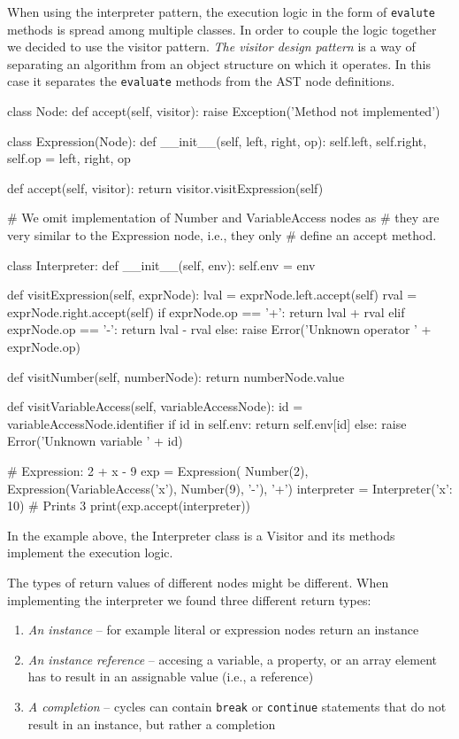 When using the interpreter pattern, the execution logic in the form of \texttt{evalute} methods is spread among multiple classes. In order to couple the
logic together we decided to use the visitor pattern. \emph{The visitor design pattern} is a way of separating an algorithm from an object structure on
which it operates. In this case it separates the \texttt{evaluate} methods from the AST node definitions.
\begin{code}
class Node:
    def accept(self, visitor):
        raise Exception('Method not implemented')

class Expression(Node):
    def __init__(self, left, right, op):
        self.left, self.right, self.op = left, right, op

    def accept(self, visitor):
        return visitor.visitExpression(self)

# We omit implementation of Number and VariableAccess nodes as
# they are very similar to the Expression node, i.e., they only
# define an accept method.

class Interpreter:
    def __init__(self, env):
        self.env = env
    
    def visitExpression(self, exprNode):
        lval = exprNode.left.accept(self)
        rval = exprNode.right.accept(self)
        if exprNode.op == '+':
            return lval + rval
        elif exprNode.op == '-':
            return lval - rval
        else:
            raise Error('Unknown operator ' + exprNode.op)
    
    def visitNumber(self, numberNode):
        return numberNode.value
    
    def visitVariableAccess(self, variableAccessNode):
        id = variableAccessNode.identifier
        if id in self.env:
            return self.env[id]
        else:
            raise Error('Unknown variable ' + id)

# Expression: 2 + x - 9
exp = Expression(
    Number(2),
    Expression(VariableAccess('x'), Number(9), '-'),
    '+')
interpreter = Interpreter({'x': 10})
# Prints 3
print(exp.accept(interpreter))
\end{code}

In the example above, the Interpreter class is a Visitor and its methods implement the execution logic.

The types of return values of different nodes might be different. When implementing the interpreter we found three different return types:
\begin{enumerate}
    \item \emph{An instance} -- for example literal or expression nodes return an instance
    \item \emph{An instance reference} -- accesing a variable, a property, or an array element has to result in an assignable value (i.e., a reference)
    \item \emph{A completion} -- cycles can contain \texttt{break} or \texttt{continue} statements that do not result in an instance, but rather a completion
\end{enumerate} 

